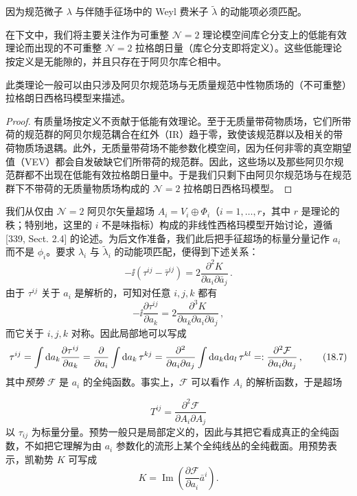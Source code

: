 因为规范微子 $\lambda$ 与伴随手征场中的 Weyl 费米子 $\tilde\lambda$ 的动能项必须匹配。

在下文中，我们将主要关注作为可重整 $\mathcal N=2$ 理论模空间库仑分支上的低能有效理论而出现的不可重整 $\mathcal N=2$ 拉格朗日量（库仑分支即将定义）。这些低能理论按定义是无能隙的，并且只存在于阿贝尔库仑相中。

\begin{proposition}[18.4]
此类理论一般可以由只涉及阿贝尔规范场与无质量规范中性物质场的（不可重整）拉格朗日西格玛模型来描述。
\end{proposition}

\begin{proof}
有质量场按定义不贡献于低能有效理论。至于无质量带荷物质场，它们所带荷的规范群的阿贝尔规范耦合在红外（IR）趋于零，致使该规范群以及相关的带荷物质场退耦。此外，无质量带荷场不能参数化模空间，因为任何非零的真空期望值（VEV）都会自发破缺它们所带荷的规范群。因此，这些场以及那些阿贝尔规范群都不出现在低能有效拉格朗日量中。于是我们只剩下由阿贝尔规范场与在规范群下不带荷的无质量物质场构成的 $\mathcal N=2$ 拉格朗日西格玛模型。
\end{proof}

我们从仅由 $\mathcal N=2$ 阿贝尔矢量超场 $A_i=V_i\oplus\Phi_i$（$i=1,\dots,r$，其中 $r$ 是理论的秩；特别地，这里的 $i$ 不是味指标）构成的非线性西格玛模型开始讨论，遵循 [339, Sect. 2.4] 的论述。为后文作准备，我们此后把手征超场的标量分量记作 $a_i$ 而不是 $\phi_i$。要求 $\lambda_i$ 与 $\tilde\lambda_i$ 的动能项匹配，便得到下述关系：
\[
-\ii(\tau^{ij}-\bar\tau^{ij})=2\frac{\partial^2K}{\partial a_i\partial\bar a_j}\,.
\]
由于 $\tau^{ij}$ 关于 $a_i$ 是解析的，可知对任意 $i,j,k$ 都有
\[
-\ii\frac{\partial\tau^{ij}}{\partial a_k}=2\frac{\partial^3K}{\partial a_k\partial a_i\partial\bar a_j}\,,
\]
而它关于 $i,j,k$ 对称。因此局部地可以写成
\begin{equation}
\tau^{ij}=\int\mathrm{d} a_k\frac{\partial\tau^{ij}}{\partial a_k}
=\frac{\partial}{\partial a_i}\int\mathrm{d} a_k\,\tau^{kj}
=\frac{\partial^2}{\partial a_i\partial a_j}\int\mathrm{d} a_k\mathrm{d} a_l\,\tau^{kl}
=:\frac{\partial^2\mathcal F}{\partial a_i\partial a_j}\,, \tag{18.7}
\end{equation}
其中\emph{预势} $\mathcal F$ 是 $a_i$ 的全纯函数。事实上，$\mathcal F$ 可以看作 $A_i$ 的解析函数，于是超场

\[
T^{ij}=\frac{\partial^2\mathcal F}{\partial A_i\partial A_j}
\]
以 $\tau_{ij}$ 为标量分量。预势一般只是局部定义的，因此与其把它看成真正的全纯函数，不如把它理解为由 $a_i$ 参数化的流形上某个全纯线丛的全纯截面。用预势表示，凯勒势 $K$ 可写成
\begin{equation}
K=\operatorname{Im}\left(\frac{\partial\mathcal F}{\partial a_i}\bar a^i\right). \tag{18.8}
\end{equation}

